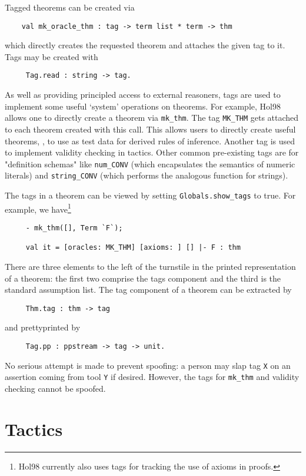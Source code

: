 \documentclass[12pt,fleqn,layout,a4paper]{report}
\begin{document}
 Tagged theorems can be created via
 \begin{verbatim}
    val mk_oracle_thm : tag -> term list * term -> thm
 \end{verbatim}
 which directly creates the requested theorem and attaches the given tag to
 it. Tags may be created with
 \begin{verbatim}
     Tag.read : string -> tag.
 \end{verbatim}
As well as providing principled access to external reasoners, tags are
used to implement some useful `system' operations on theorems. For example,
Hol98 allows one to directly create a theorem via \verb+mk_thm+. The
tag \verb+MK_THM+ gets attached to each theorem created with this
call. This allows users to directly create useful theorems, \eg, to use
as test data for derived rules of inference. Another tag
is used to implement validity checking in tactics. Other common
pre-existing tags are for "definition schemas" like \verb+num_CONV+
(which encapsulates the semantics of numeric literals) and
\verb+string_CONV+ (which performs the analogous function for strings).

The tags in a theorem can be viewed by setting \verb+Globals.show_tags+ to
true. For example, we have\footnote{Hol98 currently also uses tags for
tracking the use of axioms in proofs.}
\begin{verbatim}
     - mk_thm([], Term `F`);

     val it = [oracles: MK_THM] [axioms: ] [] |- F : thm
\end{verbatim}
There are three elements to the left of the turnstile in the printed
representation of a theorem: the first two comprise the tags component and the
third is the standard assumption list. The tag component of a theorem
can be extracted by
 \begin{verbatim}
     Thm.tag : thm -> tag
 \end{verbatim}
\noindent and prettyprinted by
 \begin{verbatim}
     Tag.pp : ppstream -> tag -> unit.
 \end{verbatim}


 No serious attempt is made to prevent spoofing: a person may slap tag
\verb+X+ on an assertion coming from tool \verb+Y+ if desired. However, the
tags for \verb+mk_thm+ and validity checking cannot be spoofed.

\section{Tactics}
\end{document}
